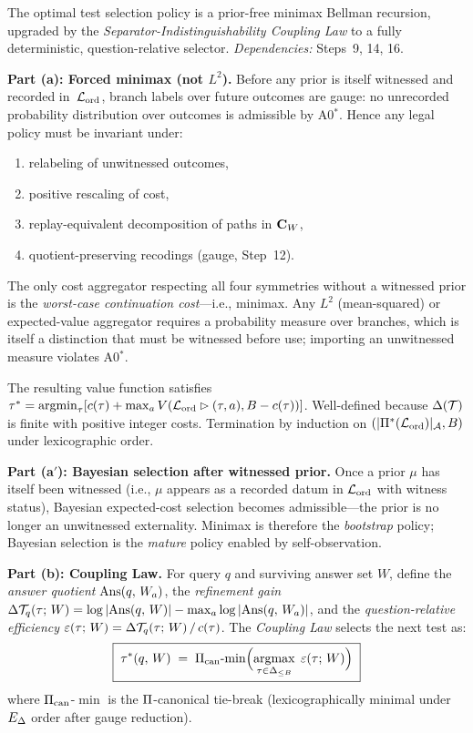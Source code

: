 \begin{theorem}
\label{thm:bellman}
The optimal test selection policy is a prior-free minimax Bellman recursion,
upgraded by the \emph{Separator-Indistinguishability Coupling Law} to a fully
deterministic, question-relative selector.
\emph{Dependencies:} Steps~9, 14, 16.

\medskip\noindent
\textbf{Part (a): Forced minimax (not $L^2$).}
Before any prior is itself witnessed and recorded in~$\mathcal{L}_{\mathrm{ord}}$, branch
labels over future outcomes are gauge: no unrecorded probability distribution
over outcomes is admissible by A0$^*$.  Hence any legal policy must be
invariant under:
\begin{enumerate}[nosep]
  \item relabeling of unwitnessed outcomes,
  \item positive rescaling of cost,
  \item replay-equivalent decomposition of paths in $\mathbf{C}_W$,
  \item quotient-preserving recodings (gauge, Step~12).
\end{enumerate}
The only cost aggregator respecting all four symmetries without a witnessed
prior is the \emph{worst-case continuation cost}---i.e., minimax.  Any
$L^2$ (mean-squared) or expected-value aggregator requires a probability
measure over branches, which is itself a distinction that must be witnessed
before use; importing an unwitnessed measure violates A0$^*$.

The resulting value function satisfies
$\tau^* = \argmin_\tau [c(\tau) + \max_a V(\OrdLedger \WitCompose (\tau,a),
B - c(\tau))]$.
Well-defined because $\Delta(\mathcal{T})$ is finite with positive integer costs.
Termination by induction on $(|\Pi^*(\mathcal{L}_{\mathrm{ord}})|_{\mathcal{A}}, B)$ under
lexicographic order.

\medskip\noindent
\textbf{Part (a$'$): Bayesian selection after witnessed prior.}
Once a prior $\mu$ has itself been witnessed (i.e., $\mu$ appears as a
recorded datum in $\mathcal{L}_{\mathrm{ord}}$ with witness status), Bayesian
expected-cost selection becomes admissible---the prior is no longer an
unwitnessed externality.  Minimax is therefore the \emph{bootstrap}
policy; Bayesian selection is the \emph{mature} policy enabled by
self-observation.

\medskip\noindent
\textbf{Part (b): Coupling Law.}
For query $q$ and surviving answer set $W$, define the \emph{answer quotient}
$\mathrm{Ans}(q,\, W_a)$, the \emph{refinement gain}
$\Delta\mathcal{T}_{q}(\tau;\, W) = \log|\mathrm{Ans}(q,\, W)| - \max_a \log|\mathrm{Ans}(q,\, W_a)|$,
and the \emph{question-relative efficiency}
$\varepsilon(\tau;\, W) = \Delta\mathcal{T}_{q}(\tau;\, W) \,/\, c(\tau)$.
The \emph{Coupling Law} selects the next test as:
\[
  \boxed{\;
    \OptTest{q}{W} \;=\;
    \PiCanon\text{-}\!\min\Bigl(
      \argmax_{\tau \in \Del_{\leq B}}\;
      \EffQ{\tau}{W}
    \Bigr)
  \;}
\]
where $\Pi_{\mathrm{can}}$-$\min$ is the $\Pi$-canonical tie-break (lexicographically
minimal under $E_\Delta$ order after gauge reduction).


\end{theorem}
